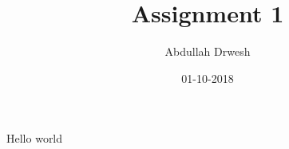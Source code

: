 \documentclass{article}
\title{Assignment 1}
\date{01-10-2018}
\author{Abdullah Drwesh}
\begin{document}
	
	\maketitle
	\newpage
		
	Hello world
\end{document}
